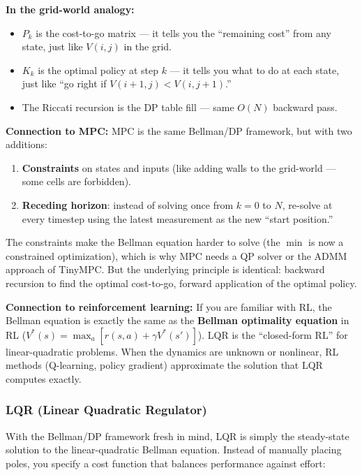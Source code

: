 \begin{mdframed}[linewidth=1pt, innertopmargin=10pt, innerbottommargin=10pt]
\textbf{In the grid-world analogy:}
\begin{itemize}[nosep]
    \item $P_k$ is the cost-to-go matrix --- it tells you the ``remaining cost'' from any state, just like $V(i,j)$ in the grid.
    \item $K_k$ is the optimal policy at step $k$ --- it tells you what to do at each state, just like ``go right if $V(i+1,j) < V(i,j+1)$.''
    \item The Riccati recursion is the DP table fill --- same $O(N)$ backward pass.
\end{itemize}
\end{mdframed}

\textbf{Connection to MPC:} MPC is the same Bellman/DP framework, but with two additions:
\begin{enumerate}
    \item \textbf{Constraints} on states and inputs (like adding walls to the grid-world --- some cells are forbidden).
    \item \textbf{Receding horizon}: instead of solving once from $k = 0$ to $N$, re-solve at every timestep using the latest measurement as the new ``start position.''
\end{enumerate}

The constraints make the Bellman equation harder to solve (the $\min$ is now a constrained optimization), which is why MPC needs a QP solver or the ADMM approach of TinyMPC. But the underlying principle is identical: backward recursion to find the optimal cost-to-go, forward application of the optimal policy.

\textbf{Connection to reinforcement learning:} If you are familiar with RL, the Bellman equation is exactly the same as the \textbf{Bellman optimality equation} in RL ($V^*(s) = \max_a [r(s,a) + \gamma V^*(s')]$). LQR is the ``closed-form RL'' for linear-quadratic problems. When the dynamics are unknown or nonlinear, RL methods (Q-learning, policy gradient) approximate the solution that LQR computes exactly.

\subsubsection{LQR (Linear Quadratic Regulator)}

With the Bellman/DP framework fresh in mind, LQR is simply the steady-state solution to the linear-quadratic Bellman equation. Instead of manually placing poles, you specify a cost function that balances performance against effort:

